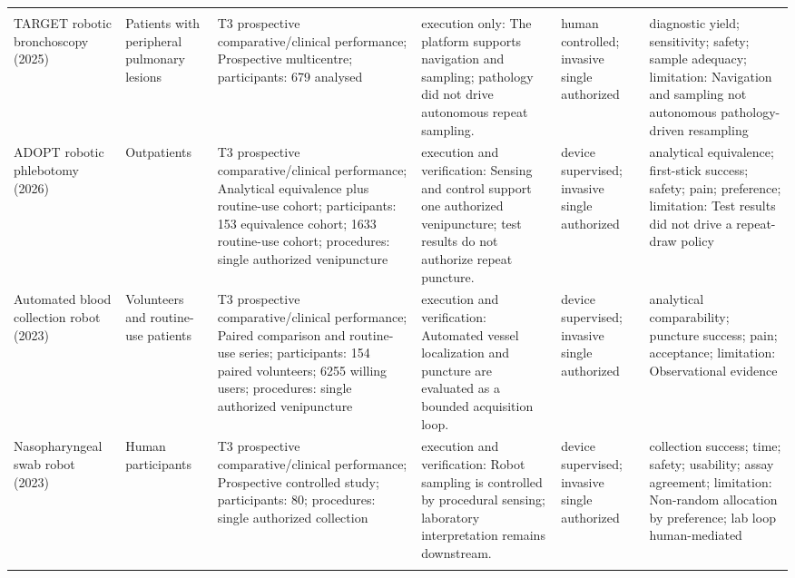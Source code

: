 \begin{longtable}{L{0.15\textwidth} L{0.13\textwidth} L{0.17\textwidth} L{0.17\textwidth} L{0.12\textwidth} L{0.14\textwidth}}
\addlinespace[2pt]\\
TARGET robotic bronchoscopy (2025) \cite{fernandezbussy2025target} & Patients with peripheral pulmonary lesions & T3 prospective comparative/clinical performance; Prospective multicentre; participants: 679 analysed & execution only: The platform supports navigation and sampling; pathology did not drive autonomous repeat sampling. & human controlled; invasive single authorized & diagnostic yield; sensitivity; safety; sample adequacy; limitation: Navigation and sampling not autonomous pathology-driven resampling \\
ADOPT robotic phlebotomy (2026) \cite{mol2026adopt} & Outpatients & T3 prospective comparative/clinical performance; Analytical equivalence plus routine-use cohort; participants: 153 equivalence cohort; 1633 routine-use cohort; procedures: single authorized venipuncture & execution and verification: Sensing and control support one authorized venipuncture; test results do not authorize repeat puncture. & device supervised; invasive single authorized & analytical equivalence; first-stick success; safety; pain; preference; limitation: Test results did not drive a repeat-draw policy \\
Automated blood collection robot (2023) \cite{wang2023bloodrobot} & Volunteers and routine-use patients & T3 prospective comparative/clinical performance; Paired comparison and routine-use series; participants: 154 paired volunteers; 6255 willing users; procedures: single authorized venipuncture & execution and verification: Automated vessel localization and puncture are evaluated as a bounded acquisition loop. & device supervised; invasive single authorized & analytical comparability; puncture success; pain; acceptance; limitation: Observational evidence \\
Nasopharyngeal swab robot (2023) \cite{chen2023swabrobot} & Human participants & T3 prospective comparative/clinical performance; Prospective controlled study; participants: 80; procedures: single authorized collection & execution and verification: Robot sampling is controlled by procedural sensing; laboratory interpretation remains downstream. & device supervised; invasive single authorized & collection success; time; safety; usability; assay agreement; limitation: Non-random allocation by preference; lab loop human-mediated \\
\addlinespace[2pt]\\

\end{longtable}
